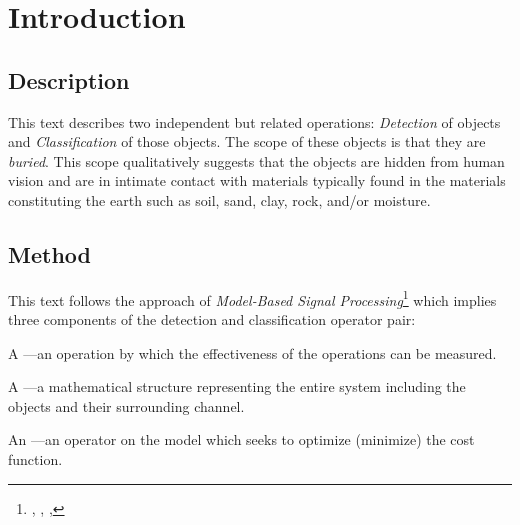 

\chapter*{Introduction}


\section{Description}
This text describes two independent but related operations: \emph{Detection} of objects 
and \emph{Classification} of those objects.
The scope of these objects is that they are \emph{buried}. 
This scope qualitatively suggests that the objects are hidden from human vision 
and are in intimate contact with materials typically found in the materials constituting the earth such as soil, sand, clay,
rock, and/or moisture.

\section{Method}
This text follows the approach of \emph{Model-Based Signal Processing}\footnote{
  , , ,  }
which implies three components of the detection and classification operator pair:
\begin{enume}
  \item A ---an operation by which the effectiveness of the operations can be measured.
  \item A ---a mathematical structure representing the entire system including the objects and their surrounding channel.
  \item An ---an operator on the model which seeks to optimize (minimize) the cost function.
\end{enume}

